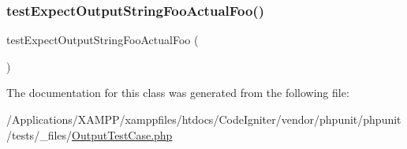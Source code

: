 \subsubsection{\texorpdfstring{test\+Expect\+Output\+String\+Foo\+Actual\+Foo()}{testExpectOutputStringFooActualFoo()}}
{\footnotesize\ttfamily test\+Expect\+Output\+String\+Foo\+Actual\+Foo (\begin{DoxyParamCaption}{ }\end{DoxyParamCaption})}



The documentation for this class was generated from the following file\+:\begin{DoxyCompactItemize}
\item 
/\+Applications/\+X\+A\+M\+P\+P/xamppfiles/htdocs/\+Code\+Igniter/vendor/phpunit/phpunit/tests/\+\_\+files/\mbox{\hyperlink{_output_test_case_8php}{Output\+Test\+Case.\+php}}\end{DoxyCompactItemize}
